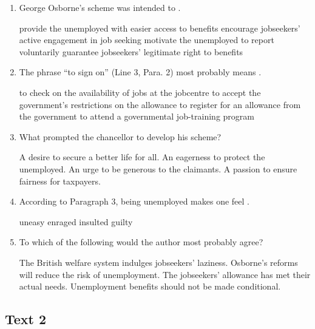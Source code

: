 \begin{enumerate}[resume]
	\item
George Osborne's scheme was intended to \lineread.


\fourchoices
{provide the unemployed with easier access to benefits}
{encourage jobseekers' active engagement in job seeking}
{motivate the unemployed to report voluntarily}
{guarantee jobseekers' legitimate right to benefits}


\item
 The phrase ``to sign on'' (Line 3, Para. 2) most probably
means \lineread.


\fourchoices
{to check on the availability of jobs at the jobcentre}
{to accept the government's restrictions on the allowance}
{to register for an allowance from the government}
{to attend a governmental job-training program}



\item
What prompted the chancellor to develop his scheme?


\fourchoices
{A desire to secure a better life for all.}
{An eagerness to protect the unemployed.}
{An urge to be generous to the claimants.}
{A passion to ensure fairness for taxpayers.}


\item
According to Paragraph 3, being unemployed makes one feel \lineread.



\fourchoices
{uneasy}
{enraged}
{insulted}
{guilty}




\item
To which of the following would the author most probably
agree?


\fourchoices
{The British welfare system indulges jobseekers' laziness.}
{Osborne's reforms will reduce the risk of unemployment.}
{The jobseekers' allowance has met their actual needs.}
{Unemployment benefits should not be made conditional.}


\end{enumerate}



\newpage
\subsection{Text 2}


